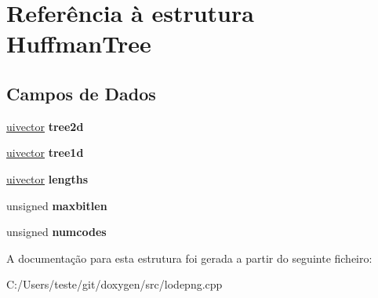 \hypertarget{struct_huffman_tree}{\section{Referência à estrutura Huffman\-Tree}
\label{struct_huffman_tree}
}
\subsection*{Campos de Dados}
\begin{DoxyCompactItemize}
\item 
\hypertarget{struct_huffman_tree_a81d41b1c8042a66426ad906302d2431e}{\hyperlink{structuivector}{uivector} {\bfseries tree2d}}\label{struct_huffman_tree_a81d41b1c8042a66426ad906302d2431e}

\item 
\hypertarget{struct_huffman_tree_a22f273147e59a21b329117c1db7b66bd}{\hyperlink{structuivector}{uivector} {\bfseries tree1d}}\label{struct_huffman_tree_a22f273147e59a21b329117c1db7b66bd}

\item 
\hypertarget{struct_huffman_tree_a968b2fdfd34d5f397cc6a9b6406cd2b8}{\hyperlink{structuivector}{uivector} {\bfseries lengths}}\label{struct_huffman_tree_a968b2fdfd34d5f397cc6a9b6406cd2b8}

\item 
\hypertarget{struct_huffman_tree_ab95e54900e2478c033b0798b5c023157}{unsigned {\bfseries maxbitlen}}\label{struct_huffman_tree_ab95e54900e2478c033b0798b5c023157}

\item 
\hypertarget{struct_huffman_tree_a1f6528f6253f4ca2c2c0b9fd5d27cb4e}{unsigned {\bfseries numcodes}}\label{struct_huffman_tree_a1f6528f6253f4ca2c2c0b9fd5d27cb4e}

\end{DoxyCompactItemize}


A documentação para esta estrutura foi gerada a partir do seguinte ficheiro\-:\begin{DoxyCompactItemize}
\item 
C\-:/\-Users/teste/git/doxygen/src/lodepng.\-cpp\end{DoxyCompactItemize}
